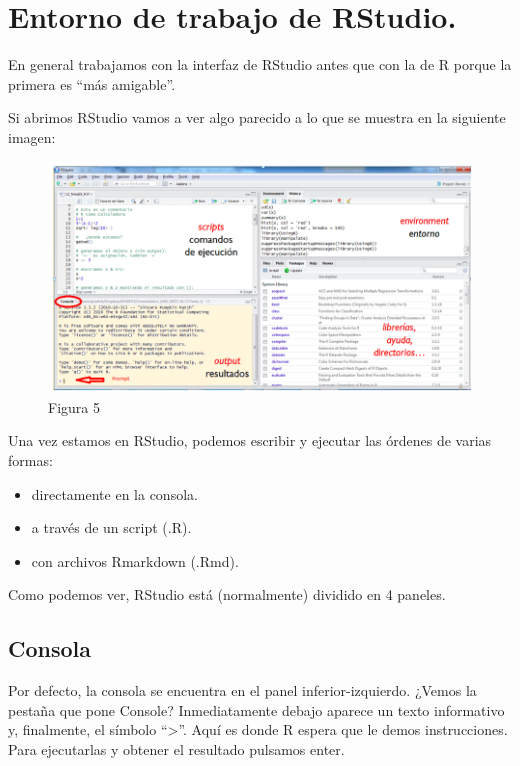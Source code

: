\documentclass[
]{book}
\begin{document}
\hypertarget{entorno-de-trabajo-de-rstudio.}{%
\section{Entorno de trabajo de RStudio.}\label{entorno-de-trabajo-de-rstudio.}}

En general trabajamos con la interfaz de RStudio antes que con la de R porque la primera es ``más amigable''.

Si abrimos RStudio vamos a ver algo parecido a lo que se muestra en la siguiente imagen:

\begin{figure}
\centering
\includegraphics{imagenes/05.png}
\caption{Figura 5}
\end{figure}

Una vez estamos en RStudio, podemos escribir y ejecutar las órdenes de varias formas:

\begin{itemize}
\item
  directamente en la consola.
\item
  a través de un script (.R).
\item
  con archivos Rmarkdown (.Rmd).
\end{itemize}

Como podemos ver, RStudio está (normalmente) dividido en 4 paneles.

\hypertarget{consola}{%
\subsection{Consola}\label{consola}}

Por defecto, la consola se encuentra en el panel inferior-izquierdo. ¿Vemos la pestaña que pone Console? Inmediatamente debajo aparece un texto informativo y, finalmente, el símbolo ``\textgreater{}''. Aquí es donde R espera que le demos instrucciones. Para ejecutarlas y obtener el resultado pulsamos enter.
\end{document}
